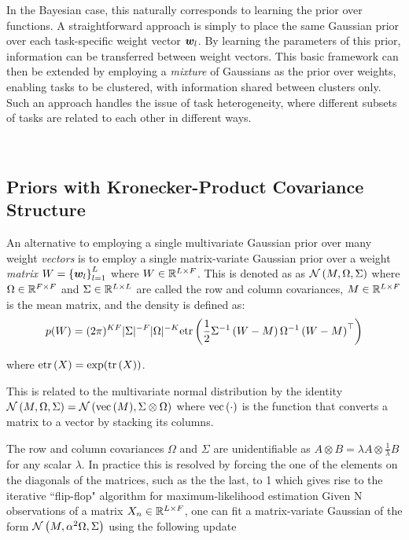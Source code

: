 In the Bayesian case, this naturally corresponds to learning the prior over functions. A straightforward approach\cite{Allenby1999} is simply to place the same Gaussian prior over each task-specific weight vector $\bm w_l$. By learning the parameters of this prior, information can be transferred between weight vectors. This basic framework can then be extended by employing a \emph{mixture} of Gaussians as the prior over weights\cite{BakkerHeskes2003}, enabling tasks to be clustered, with information shared between clusters only. Such an approach handles the issue of task heterogeneity, where different subsets of tasks are related to each other in different ways.


%

\

\subsection{Priors with Kronecker-Product Covariance Structure}
An alternative to employing a single multivariate Gaussian prior over many weight \emph{vectors} is to employ a single matrix-variate Gaussian\cite{Gupta1999} prior over a weight \emph{matrix} $W = \left\{\bm w_l\right\}_{l=1}^L$ where $W \in { \mathbb{R}^{L \times F} }$. This is denoted as as $\mathcal{N} \left(M, \Omega, \Sigma\right)$ where $\Omega \in { \mathbb{R}^{F \times F} }$ and $\Sigma \in { \mathbb{R}^{L \times L} }$ are called the row and column covariances, $M \in { \mathbb{R}^{L \times F} }$ is the mean matrix, and the density is defined as:
\begin{equation}
p(W) = (2\pi)^{KF}|\Sigma|^{-F}|\Omega|^{-K} \text{etr}\left( { \frac{1}{2} {\Sigma}^{-1}\left(W - M\right) {\Omega}^{-1} \left(W - M \right)^\top } \right)
\end{equation}

where $\text{etr}\left( { X } \right) = \exp (\text{tr} \left( {X} \right))$.

This is related to the multivariate normal distribution by the identity $\mathcal{N} \left(M, \Omega, \Sigma\right) = \mathcal{N} \left( {\text{vec}\left(M\right)}, {\Sigma \otimes \Omega} \right)$ where $\text{vec}\left(\cdot\right)$ is the function that converts a matrix to a vector by stacking its columns. 

The row and column covariances $\Omega$ and $\Sigma$ are unidentifiable as $A \otimes B = \lambda A \otimes \frac{1}{\lambda}B$ for any scalar $\lambda$. In practice this is resolved by forcing the one of the elements on the diagonals of the matrices, such as the the last, to 1 which gives rise to the iterative ``flip-flop" algorithm\cite{Srivastava2009} for maximum-likelihood estimation Given N observations of a matrix $X_n \in { \mathbb{R}^{L \times F} }$, one can fit a matrix-variate Gaussian of the form $\mathcal{N} \left(M, \alpha^2 \Omega, \Sigma\right)$ using the following update

